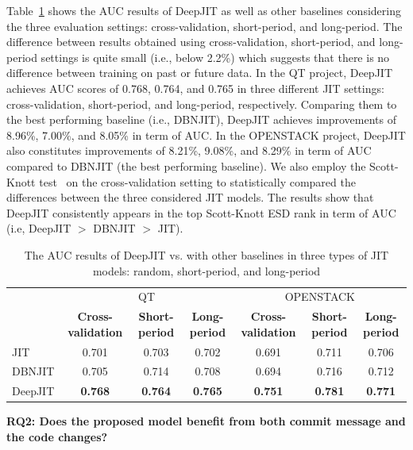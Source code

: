 Table~\ref{tab:results} shows the AUC results of DeepJIT as well as other baselines considering the three evaluation settings: cross-validation, short-period, and long-period. The difference between results obtained using cross-validation, short-period, and long-period settings is quite small (i.e., below 2.2\%) which suggests that there is no difference between training on past or future data. 
In the QT project, DeepJIT achieves AUC scores of 0.768, 0.764, and 0.765 in three different JIT settings: cross-validation, short-period, and long-period, respectively. Comparing them to the best performing baseline (i.e., DBNJIT), DeepJIT achieves improvements of 8.96\%, 7.00\%, and 8.05\% in term of AUC. In the OPENSTACK project, DeepJIT also constitutes improvements of 8.21\%, 9.08\%, and 8.29\% in term of AUC compared to DBNJIT (the best performing baseline). We also employ the Scott-Knott test~\cite{ghotra2015revisiting} on the cross-validation setting to statistically compared the differences between the three considered JIT models. The results show that DeepJIT consistently appears in the top Scott-Knott ESD rank in term of AUC (i.e, DeepJIT $>$ DBNJIT $>$ JIT).  

\begin{table}[t!]
	\centering
	\caption{The AUC results of DeepJIT vs. with other baselines in three types of JIT models: random, short-period, and long-period}
	\begin{tabular}{|l|c|c|c|c|c|c|}
		\hline
		\multirow{2}[4]{*}{} & \multicolumn{3}{c|}{QT} & \multicolumn{3}{c|}{OPENSTACK} \\
		\cline{2-7}          & \textbf{Cross-validation} & \textbf{Short-period} & \textbf{Long-period} & \textbf{Cross-validation} & \textbf{Short-period} & \textbf{Long-period} \\
		\hline
		\hline
		JIT   & 0.701 & 0.703 & 0.702 & 0.691 & 0.711 & 0.706 \\
		\hline
		DBNJIT & 0.705 & 0.714 & 0.708 & 0.694 & 0.716 & 0.712 \\
		\hline
		DeepJIT & \textbf{0.768} & \textbf{0.764} & \textbf{0.765} & \textbf{0.751} & \textbf{0.781} & \textbf{0.771} \\
		\hline
	\end{tabular}%
	\label{tab:results}%
\end{table}%

\noindent \textbf{RQ2: Does the proposed model benefit from both commit message and the code changes?}

